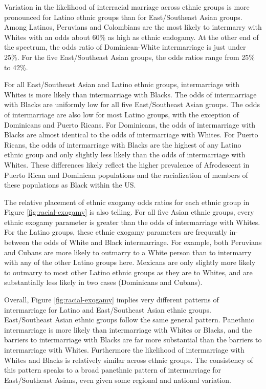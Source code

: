 \documentclass[11pt,]{article}
\begin{document}
Variation in the likelihood of interracial marriage across ethnic groups is more pronounced for Latino ethnic groups than for East/Southeast Asian groups. Among Latinos, Peruvians and Colombians are the most likely to intermarry with Whites with an odds about 60\% as high as ethnic endogamy. At the other end of the spectrum, the odds ratio of Dominican-White intermarriage is just under 25\%. For the five East/Southeast Asian groups, the odds ratios range from 25\% to 42\%.

For all East/Southeast Asian and Latino ethnic groups, intermarriage with Whites is more likely than intermarriage with Blacks. The odds of intermarriage with Blacks are uniformly low for all five East/Southeast Asian groups. The odds of intermarriage are also low for most Latino groups, with the exception of Dominicans and Puerto Ricans. For Dominicans, the odds of intermarriage with Blacks are almost identical to the odds of intermarriage with Whites. For Puerto Ricans, the odds of intermarriage with Blacks are the highest of any Latino ethnic group and only slightly less likely than the odds of intermarriage with Whites. These differences likely reflect the higher prevalence of Afrodescent in Puerto Rican and Dominican populations and the racialization of members of these populations as Black within the US.

The relative placement of ethnic exogamy odds ratios for each ethnic group in Figure \ref{fig:racial-exogamy} is also telling. For all five Asian ethnic groups, every ethnic exogamy parameter is greater than the odds of intermarriage with Whites. For the Latino groups, these ethnic exogamy parameters are frequently in-between the odds of White and Black intermarriage. For example, both Peruvians and Cubans are more likely to outmarry to a White person than to intermarry with any of the other Latino groups here. Mexicans are only slightly more likely to outmarry to most other Latino ethnic groups as they are to Whites, and are substantially less likely in two cases (Dominicans and Cubans).

Overall, Figure \ref{fig:racial-exogamy} implies very different patterns of intermarriage for Latino and East/Southeast Asian ethnic groups. East/Southeast Asian ethnic groups follow the same general pattern. Panethnic intermarriage is more likely than intermarriage with Whites or Blacks, and the barriers to intermarriage with Blacks are far more substantial than the barriers to intermarriage with Whites. Furthermore the likelihood of intermarriage with Whites and Blacks is relatively similar across ethnic groups. The consistency of this pattern speaks to a broad panethnic pattern of intermarriage for East/Southeast Asians, even given some regional and national variation.
\end{document}

